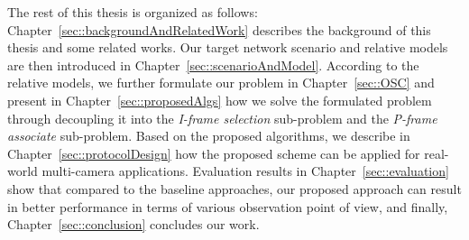 The rest of this thesis is organized as follows:
Chapter~\ref{sec::backgroundAndRelatedWork} describes the background of this thesis and some related works.
Our target network scenario and relative models are then introduced in Chapter~\ref{sec::scenarioAndModel}.
According to the relative models, we further formulate our problem in Chapter~\ref{sec::OSC} and present in Chapter~\ref{sec::proposedAlgs} how we solve the formulated problem through decoupling it into the {\em I-frame selection} sub-problem and the {\em P-frame associate} sub-problem. 
Based on the proposed algorithms, we describe in Chapter~\ref{sec::protocolDesign} how the proposed scheme can be applied for real-world multi-camera applications.
Evaluation results in Chapter~\ref{sec::evaluation} show that compared to the baseline approaches, our proposed approach can result in better performance in terms of various observation point of view, and finally, Chapter~\ref{sec::conclusion} concludes our work.